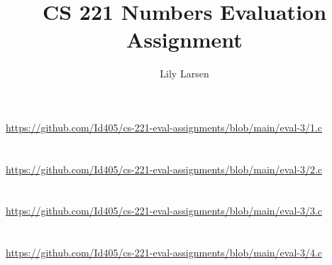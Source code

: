 \documentclass{article}
\title{CS 221 Numbers Evaluation Assignment}
\author{Lily Larsen}
\begin{document}
\maketitle
\newpage

\section{}
\href{https://github.com/Id405/cs-221-eval-assignments/blob/main/eval-3/1.c}{https://github.com/Id405/cs-221-eval-assignments/blob/main/eval-3/1.c}
\newpage

\section{}
\href{https://github.com/Id405/cs-221-eval-assignments/blob/main/eval-3/2.c}{https://github.com/Id405/cs-221-eval-assignments/blob/main/eval-3/2.c}
\newpage

\section{}
\href{https://github.com/Id405/cs-221-eval-assignments/blob/main/eval-3/3.c}{https://github.com/Id405/cs-221-eval-assignments/blob/main/eval-3/3.c}
\newpage

\section{}
\href{https://github.com/Id405/cs-221-eval-assignments/blob/main/eval-3/4.c}{https://github.com/Id405/cs-221-eval-assignments/blob/main/eval-3/4.c}
\newpage
\newpage
\end{document}
